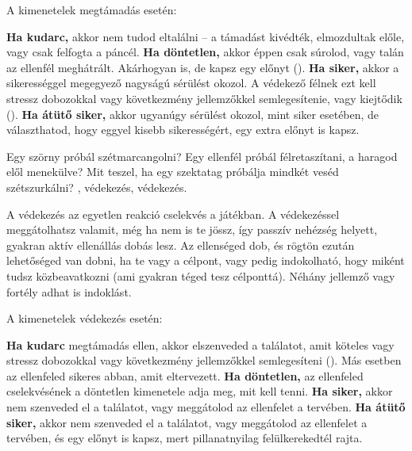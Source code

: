 A kimenetelek megtámadás esetén:

\begin{itemize}
    \failureitem \textbf{Ha kudarc,} akkor nem tudod eltalálni – a támadást kivédték, elmozdultak előle, vagy csak felfogta a páncél.
    \tieitem \textbf{Ha döntetlen,} akkor éppen csak súrolod, vagy talán az ellenfél meghátrált. Akárhogyan is, de kapsz egy előnyt ().
    \successitem \textbf{Ha siker,} akkor a sikerességgel megegyező nagyságú sérülést okozol. A védekező félnek ezt kell stressz dobozokkal vagy következmény jellemzőkkel semlegesítenie, vagy kiejtődik ().
    \successwithstyleitem \textbf{Ha átütő siker,} akkor ugyanúgy sérülést okozol, mint siker esetében, de választhatod, hogy eggyel kisebb sikerességért, egy extra előnyt is kapsz.
\end{itemize}


\newpage


Egy szörny próbál szétmarcangolni? Egy ellenfél próbál félretaszítani, a haragod elől menekülve? Mit teszel, ha egy szektatag próbálja mindkét veséd szétszurkálni? , védekezés, védekezés.

A védekezés az egyetlen reakció cselekvés a  játékban. A védekezéssel meggátolhatsz valamit, még ha nem is te jössz, így passzív nehézség helyett, gyakran aktív ellenállás dobás lesz. Az ellenséged dob, és rögtön ezután lehetőséged van dobni, ha te vagy a célpont, vagy pedig indokolható, hogy miként tudsz közbeavatkozni (ami gyakran téged tesz célponttá). Néhány jellemző vagy fortély adhat is indoklást.

A kimenetelek védekezés esetén:

\begin{itemize}
    \failureitem \textbf{Ha kudarc} megtámadás ellen, akkor elszenveded a találatot, amit köteles vagy stressz dobozokkal vagy következmény jellemzőkkel semlegesíteni (). Más esetben az ellenfeled sikeres abban, amit eltervezett.
    \tieitem \textbf{Ha döntetlen,} az ellenfeled cselekvésének a döntetlen kimenetele adja meg, mit kell tenni.
    \successitem \textbf{Ha siker,} akkor nem szenveded el a találatot, vagy meggátolod az ellenfelet a tervében.
    \successwithstyleitem \textbf{Ha átütő siker,} akkor nem szenveded el a találatot, vagy meggátolod az ellenfelet a tervében, és egy előnyt is kapsz, mert pillanatnyilag felülkerekedtél rajta.
\end{itemize}

